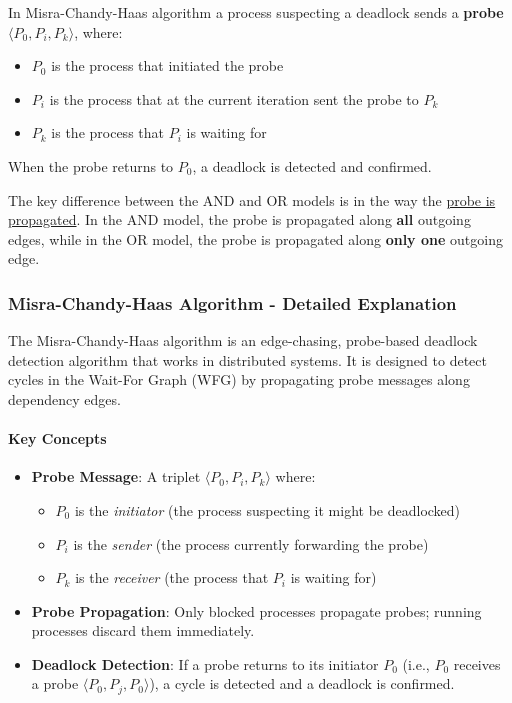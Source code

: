 In Misra-Chandy-Haas algorithm a process suspecting a deadlock sends a \textbf{probe} $\langle P_0,P_i,P_k\rangle$, where:
\begin{itemize}
   \item $P_0$ is the process that initiated the probe
   \item $P_i$ is the process that at the current iteration sent the probe to $P_k$
   \item $P_k$ is the process that $P_i$ is waiting for
\end{itemize}
When the probe returns to $P_0$, a deadlock is detected and confirmed.

The key difference between the AND and OR models is in the way the \ul{probe is propagated}. In the AND model, the probe is propagated along \textbf{all} outgoing edges, while in the OR model, the probe is propagated along \textbf{only one} outgoing edge.

\subsubsection{Misra-Chandy-Haas Algorithm - Detailed Explanation}

The Misra-Chandy-Haas algorithm is an edge-chasing, probe-based deadlock detection algorithm that works in distributed systems. It is designed to detect cycles in the Wait-For Graph (WFG) by propagating probe messages along dependency edges.

\paragraph{Key Concepts}
\begin{itemize}
   \item \textbf{Probe Message}: A triplet $\langle P_0, P_i, P_k \rangle$ where:
   \begin{itemize}
      \item $P_0$ is the \textit{initiator} (the process suspecting it might be deadlocked)
      \item $P_i$ is the \textit{sender} (the process currently forwarding the probe)
      \item $P_k$ is the \textit{receiver} (the process that $P_i$ is waiting for)
   \end{itemize}
   \item \textbf{Probe Propagation}: Only blocked processes propagate probes; running processes discard them immediately.
   \item \textbf{Deadlock Detection}: If a probe returns to its initiator $P_0$ (i.e., $P_0$ receives a probe $\langle P_0, P_j, P_0 \rangle$), a cycle is detected and a deadlock is confirmed.
\end{itemize}

